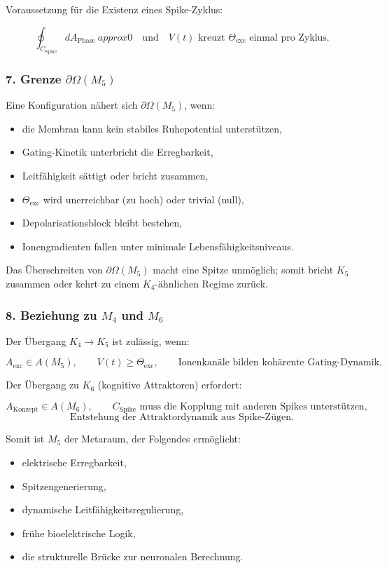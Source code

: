 Voraussetzung für die Existenz eines Spike-Zyklus:

\[
\oint_{C_{\mathrm{Spike}}} dA_{\mathrm{Phase}} \ approx 0
\quad\text{und}\quad
V(t) \text{ kreuzt } \Theta_{\mathrm{exc}} \text{ einmal pro Zyklus}.
\]

\subsubsection*{7. Grenze \texorpdfstring{$\partial\Omega(M_5)$}{\partial\Omega(M_5)}}

Eine Konfiguration nähert sich $\partial\Omega(M_5)$, wenn:

\begin{itemize}
    \item die Membran kann kein stabiles Ruhepotential unterstützen,
    \item Gating-Kinetik unterbricht die Erregbarkeit,
    \item Leitfähigkeit sättigt oder bricht zusammen,
    \item $\Theta_{\mathrm{exc}}$ wird unerreichbar (zu hoch) oder trivial (null),
    \item Depolarisationsblock bleibt bestehen,
    \item Ionengradienten fallen unter minimale Lebensfähigkeitsniveaus.
\end{itemize}

Das Überschreiten von $\partial\Omega(M_5)$ macht eine Spitze unmöglich;
somit bricht $K_5$ zusammen oder kehrt zu einem $K_4$-ähnlichen Regime zurück.

\subsubsection*{8. Beziehung zu \texorpdfstring{$M_4$}{M_4} und \texorpdfstring{$M_6$}{M_6}}

Der Übergang $K_4 \to K_5$ ist zulässig, wenn:

\[
A_{\mathrm{exc}} \in A(M_5),
\qquad
V(t)\ge\Theta_{\mathrm{exc}},
\qquad
\text{Ionenkanäle bilden kohärente Gating-Dynamik}.
\]

Der Übergang zu $K_6$ (kognitive Attraktoren) erfordert:

\[
A_{\mathrm{Konzept}} \in A(M_6),
\qquad
C_{\mathrm{Spike}} \text{ muss die Kopplung mit anderen Spikes unterstützen},
\]
\[
\text{Entstehung der Attraktordynamik aus Spike-Zügen}.
\]

Somit ist $M_5$ der Metaraum, der Folgendes ermöglicht:

\begin{itemize}
    \item elektrische Erregbarkeit,
    \item Spitzengenerierung,
    \item dynamische Leitfähigkeitsregulierung,
    \item frühe bioelektrische Logik,
    \item die strukturelle Brücke zur neuronalen Berechnung.
\end{itemize}
